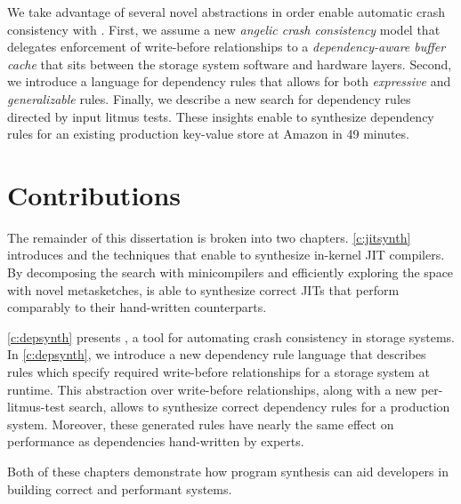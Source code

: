 We take advantage of several novel abstractions in order enable
automatic crash consistency with \depsynth.
First, we assume a new \textit{angelic crash consistency} model
that delegates enforcement of write-before relationships to a
\textit{dependency-aware buffer cache}
that sits between the storage system software and hardware layers.
Second, we introduce a language for dependency rules
that allows for both \textit{expressive} and \textit{generalizable} rules.
Finally, we describe a new search for dependency rules
directed by input litmus tests.
These insights enable \depsynth to synthesize dependency rules for an existing
production key-value store at Amazon in 49 minutes.

\section{Contributions}
The remainder of this dissertation is broken into two chapters.
\cref{c:jitsynth} introduces \jitsynth and the techniques that enable
\jitsynth to synthesize in-kernel JIT compilers.
By decomposing the search with minicompilers
and efficiently exploring the space with novel metasketches,
\jitsynth is able to synthesize correct JITs that perform
comparably to their hand-written counterparts.

\cref{c:depsynth} presents \depsynth, a tool for automating
crash consistency in storage systems. In \cref{c:depsynth},
we introduce a new dependency rule language that describes rules
which specify required write-before relationships for a storage system
at runtime. This abstraction over write-before relationships, along
with a new per-litmus-test search, allows \depsynth to synthesize
correct dependency rules for a production system.
Moreover, these generated rules have nearly the same effect on performance
as dependencies hand-written by experts.

Both of these chapters demonstrate
how program synthesis can aid developers in building
correct and performant systems.

